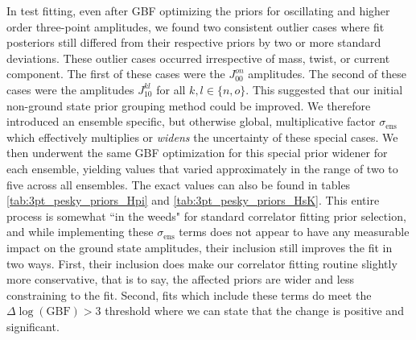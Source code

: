 
In test fitting, even after GBF optimizing the priors for oscillating and higher order three-point amplitudes, we found two consistent outlier cases where fit posteriors still differed from their respective priors by two or more standard deviations.  These outlier cases occurred irrespective of mass, twist, or current component.  The first of these cases were the $J_{00}^{on}$ amplitudes.  The second of these cases were the amplitudes $J_{10}^{kl}$ for all $k,l \in \{n,o\}$.  This suggested that our initial non-ground state prior grouping method could be improved.  We therefore introduced an ensemble specific, but otherwise global, multiplicative factor $\sigma_\mathrm{ens}$ which effectively multiplies or \textit{widens} the uncertainty of these special cases.  We then underwent the same GBF optimization for this special prior widener for each ensemble, yielding values that varied approximately in the range of two to five across all ensembles.  The exact values can also be found in tables \ref{tab:3pt_pesky_priors_Hpi} and \ref{tab:3pt_pesky_priors_HsK}. This entire process is somewhat ``in the weeds" for standard correlator fitting prior selection, and while implementing these $\sigma_\mathrm{ens}$ terms does not appear to have any measurable impact on the ground state amplitudes, their inclusion still improves the fit in two ways.  First, their inclusion does make our correlator fitting routine slightly more conservative, that is to say, the affected priors are wider and less constraining to the fit.  Second, fits which include these terms do meet the $\Delta \log(\mathrm{GBF}) > 3$ threshold where we can state that the change is positive and significant. 

